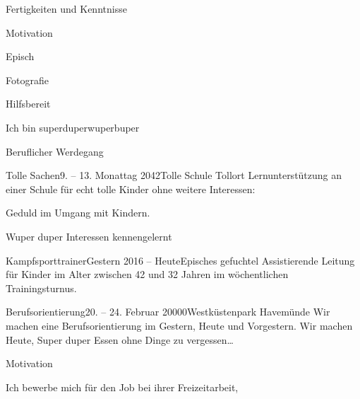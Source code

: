 \documentclass{application-maverick}
\begin{document}
\begin{ap-page}
        \begin{block}[\faTasks]{Fertigkeiten und Kenntnisse} %
            \begin{bulletpoints}[2]
                \item Motivation 
                \item Episch 
                \item Fotografie 
                \item Hilfsbereit 
                \item Ich bin superduperwuperbuper
            \end{bulletpoints}
        \end{block}
        \begin{block}[\faSuitcase]{Beruflicher Werdegang}
            \begin{timeline}
                \begin{event}{Tolle Sachen}{9. -- 13. Monattag 2042}{Tolle Schule Tollort}
                    Lernunterstützung an einer Schule für echt tolle Kinder ohne weitere Interessen: \begin{bulletpoints}
                        \item Geduld im Umgang mit Kindern.
                        \item Wuper duper Interessen kennengelernt
                    \end{bulletpoints}
                \end{event}
                \begin{event}{Kampfsporttrainer}{Gestern 2016 -- Heute}{Episches gefuchtel}
                    Assistierende Leitung für Kinder im Alter zwischen 42 und 32 Jahren im wöchentlichen Trainingsturnus.
                \end{event}
                \begin{event}{Berufsorientierung}{20. -- 24. Februar 20000}{Westküstenpark Havemünde}
                    Wir machen eine Berufsorientierung im Gestern, Heute und Vorgestern. Wir machen Heute, Super duper Essen ohne Dinge zu vergessen\ldots
                \end{event}
            \end{timeline}
        \end{block}
        \begin{block}[\faThumbsOUp]{Motivation}
            \begin{text}
                Ich bewerbe mich für den Job bei ihrer Freizeitarbeit, \blindtext
            \end{text}
        \end{block}
    \end{ap-page}
\end{document}

